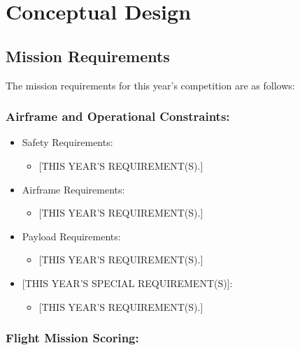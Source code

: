 \documentclass[report]{byu-aero}
\begin{document}
\section{Conceptual Design} %
\label{sec:ConceptualDesign}


\subsection{Mission Requirements}
\label{ssec:missionreqs}

The mission requirements for this year's competition are as follows:

\subsubsection{Airframe and Operational Constraints:}
\begin{itemize}
	\item Safety Requirements:
	\begin{itemize}
		\item {\color{\BYUred} [THIS YEAR'S REQUIREMENT(S).]}
	\end{itemize}
	\item Airframe Requirements:
	\begin{itemize}
		\item {\color{\BYUred} [THIS YEAR'S REQUIREMENT(S).]}
	\end{itemize}
	\item Payload Requirements:
	\begin{itemize}
		\item {\color{\BYUred} [THIS YEAR'S REQUIREMENT(S).]}
	\end{itemize}
	\item {\color{\BYUred} [THIS YEAR'S SPECIAL REQUIREMENT(S)]}:
	\begin{itemize}
		\item {\color{\BYUred} [THIS YEAR'S REQUIREMENT(S).]}
	\end{itemize}
\end{itemize}



\subsubsection{Flight Mission Scoring:}
\end{document}
